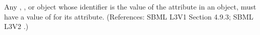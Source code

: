 Any \Compartment, \Species, \Parameter or \SpeciesReference object whose
identifier is the value of the attribute  in an
\AssignmentRule object, must have a value of  for its
 attribute.  (References: SBML L3V1 Section 4.9.3; SBML L3V2
.)
